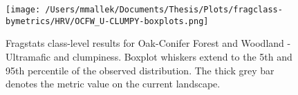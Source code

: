 \begin{figure}[!htbp]
\centering
    \texttt{[image: /Users/mmallek/Documents/Thesis/Plots/fragclass-bymetrics/HRV/OCFW\_U-CLUMPY-boxplots.png]}
  \caption{Fragstats class-level results for Oak-Conifer Forest and Woodland - Ultramafic and clumpiness. Boxplot whiskers extend to the 5th and 95th percentile of the observed distribution. The thick grey bar denotes the metric value on the current landscape.}
  \label{fig:ocfwu_clumpy}
\end{figure}



